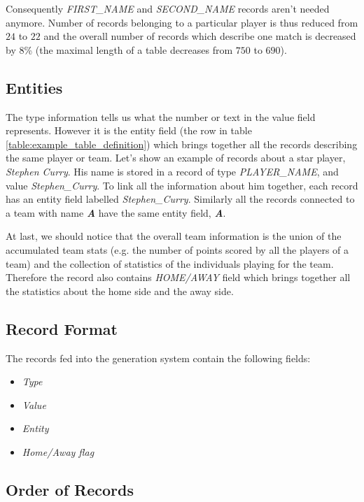 Consequently \emph{FIRST\_NAME} and \emph{SECOND\_NAME} records aren't needed anymore. Number of records belonging to a particular player is thus reduced from $24$ to $22$ and the overall number of records which describe one match is decreased by $8$\% (the maximal length of a table decreases from $750$ to $690$).

\subsection{Entities}

The type information tells us what the number or text in the value field represents. However it is the entity field (the row in table \ref{table:example_table_definition}) which brings together all the records describing the same player or team. Let's show an example of records about a star player, \emph{Stephen Curry}. His name is stored in a record of type \emph{PLAYER\_NAME}, and value \emph{Stephen\_Curry}. To link all the information about him together, each record has an entity field labelled \emph{Stephen\_Curry}. Similarly all the records connected to a team with name \emph{\textbf{A}} have the same entity field, \emph{\textbf{A}}.

At last, we should notice that the overall team information is the union of the accumulated team stats (e.g. the number of points scored by all the players of a team) and the collection of statistics of the individuals playing for the team. Therefore the record also contains \emph{HOME/AWAY} field which brings together all the statistics about the home side and the away side.

\subsection{Record Format} \label{subsection:record_format}

The records fed into the generation system contain the following fields:

\begin{itemize}
    \item \emph{Type}
    \item \emph{Value}
    \item \emph{Entity}
    \item \emph{Home/Away flag}
\end{itemize}

\subsection{Order of Records}

